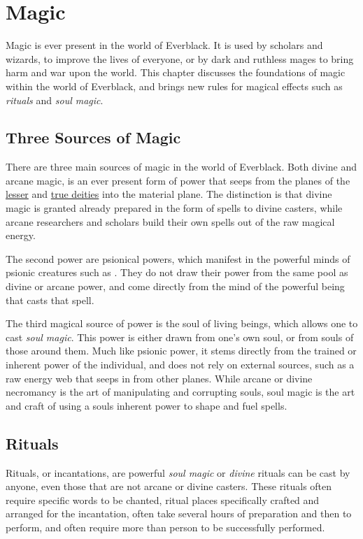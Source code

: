 \section{Magic}
\label{sec:Magic}

Magic is ever present in the world of Everblack. It is used by scholars and
wizards, to improve the lives of everyone, or by dark and ruthless mages to
bring harm and war upon the world. This chapter discusses the foundations of
magic within the world of Everblack, and brings new rules for magical effects
such as \emph{rituals} and \emph{soul magic}.

\subsection{Three Sources of Magic}

There are three main sources of magic in the world of Everblack. Both divine
and arcane magic, is an ever present form of power that seeps from the planes
of the \hyperref[sec:Lesser Deities]{lesser} and \hyperref[sec:True
  Deities]{true deities} into the material plane. The distinction is that
divine magic is granted already prepared in the form of spells to divine
casters, while arcane researchers and scholars build their own spells out of
the raw magical energy.

The second power are psionical powers, which manifest in the powerful minds of
psionic creatures such as . They do not draw their power
from the same pool as divine or arcane power, and come directly from the mind
of the powerful being that casts that spell.

The third magical source of power is the soul of living beings, which allows
one to cast \emph{soul magic}. This power is either drawn from one's own soul,
or from souls of those around them. Much like psionic power, it stems directly
from the trained or inherent power of the individual, and does not rely on
external sources, such as a raw energy web that seeps in from other planes.
While arcane or divine necromancy is the art of manipulating and corrupting
souls, soul magic is the art and craft of using a souls inherent power to
shape and fuel spells.

\subsection{Rituals}
\label{sec:Rituals}

Rituals, or incantations, are powerful \emph{soul magic} or \emph{divine}
rituals can be cast by anyone, even those that are not arcane or divine
casters. These rituals often require specific words to be chanted, ritual
places specifically crafted and arranged for the incantation, often take
several hours of preparation and then to perform, and often require more than
person to be successfully performed.


